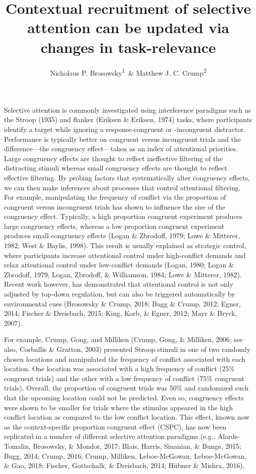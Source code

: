 \documentclass[english,,man,floatsintext]{apa6}
\title{Contextual recruitment of selective attention can be updated via changes in task-relevance}
\author{Nicholaus P. Brosowsky\textsuperscript{1}~\& Matthew J. C. Crump\textsuperscript{2}}
\date{}
\affiliation{
\vspace{0.5cm}
\textsuperscript{1} The Graduate Center of the City University of New York\\\textsuperscript{2} Brooklyn College of the City University of New York}
\begin{document}
\maketitle

Selective attention is commonly investigated using interference paradigms such as the Stroop (1935) and flanker (Eriksen \& Eriksen, 1974) tasks, where participants identify a target while ignoring a response-congruent or -incongruent distractor. Performance is typically better on congruent versus incongruent trials and the difference---the congruency effect---taken as an index of attentional priorities. Large congruency effects are thought to reflect ineffective filtering of the distracting stimuli whereas small congruency effects are thought to reflect effective filtering. By probing factors that systematically alter congruency effects, we can then make inferences about processes that control attentional filtering. For example, manipulating the frequency of conflict via the proportion of congruent versus incongruent trials has shown to influence the size of the congruency effect. Typically, a high proportion congruent experiment produces large congruency effects, whereas a low proportion congruent experiment produces small congruency effects (Logan \& Zbrodoff, 1979; Lowe \& Mitterer, 1982; West \& Baylis, 1998). This result is usually explained as strategic control, where participants increase attentional control under high-conflict demands and relax attentional control under low-conflict demands (Logan, 1980; Logan \& Zbrodoff, 1979; Logan, Zbrodoff, \& Williamson, 1984; Lowe \& Mitterer, 1982). Recent work however, has demonstrated that attentional control is not only adjusted by top-down regulation, but can also be triggered automatically by environmental cues (Brosowsky \& Crump, 2018; Bugg \& Crump, 2012; Egner, 2014; Fischer \& Dreisbach, 2015; King, Korb, \& Egner, 2012; Mayr \& Bryck, 2007).

For example, Crump, Gong, and Milliken (Crump, Gong, \& Milliken, 2006; see also, Corballis \& Gratton, 2003) presented Stroop stimuli in one of two randomly chosen locations and manipulated the frequency of conflict associated with each location. One location was associated with a high frequency of conflict (25\% congruent trials) and the other with a low frequency of conflict (75\% congruent trials). Overall, the proportion of congruent trials was 50\% and randomized such that the upcoming location could not be predicted. Even so, congruency effects were shown to be smaller for trials where the stimulus appeared in the high conflict location as compared to the low conflict location. This effect, known now as the context-specific proportion congruent effect (CSPC), has now been replicated in a number of different selective attention paradigms (e.g., Alards-Tomalin, Brosowsky, \& Mondor, 2017; Blais, Harris, Sinanian, \& Bunge, 2015; Bugg, 2014; Crump, 2016; Crump, Milliken, Leboe-McGowan, Leboe-McGowan, \& Gao, 2018; Fischer, Gottschalk, \& Dreisbach, 2014; Hübner \& Mishra, 2016).
\end{document}
